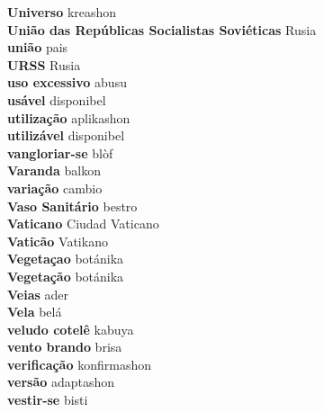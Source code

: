 \textbf{ Universo  } kreashon \\
\textbf{ União das Repúblicas Socialistas Soviéticas  } Rusia \\
\textbf{ união  } pais \\
\textbf{ URSS  } Rusia \\
\textbf{ uso excessivo  } abusu \\
\textbf{ usável  } disponibel \\
\textbf{ utilização  } aplikashon \\
\textbf{ utilizável  } disponibel \\
\textbf{ vangloriar-se  } blòf \\
\textbf{ Varanda  } balkon \\
\textbf{ variação  } cambio \\
\textbf{ Vaso Sanitário  } bestro \\
\textbf{ Vaticano  } Ciudad Vaticano \\
\textbf{ Vaticão  } Vatikano \\
\textbf{ Vegetaçao  } botánika \\
\textbf{ Vegetação  } botánika \\
\textbf{ Veias  } ader \\
\textbf{ Vela  } belá \\
\textbf{ veludo cotelê  } kabuya \\
\textbf{ vento brando  } brisa \\
\textbf{ verificação  } konfirmashon \\
\textbf{ versão  } adaptashon \\
\textbf{ vestir-se  } bisti \\
